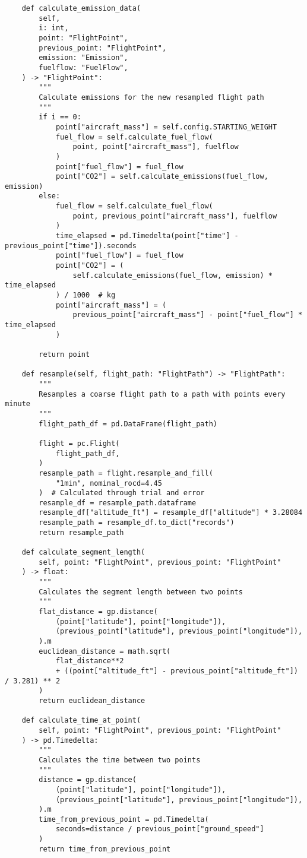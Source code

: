 \begin{verbatim}
    def calculate_emission_data(
        self,
        i: int,
        point: "FlightPoint",
        previous_point: "FlightPoint",
        emission: "Emission",
        fuelflow: "FuelFlow",
    ) -> "FlightPoint":
        """
        Calculate emissions for the new resampled flight path
        """
        if i == 0:
            point["aircraft_mass"] = self.config.STARTING_WEIGHT
            fuel_flow = self.calculate_fuel_flow(
                point, point["aircraft_mass"], fuelflow
            )
            point["fuel_flow"] = fuel_flow
            point["CO2"] = self.calculate_emissions(fuel_flow, emission)
        else:
            fuel_flow = self.calculate_fuel_flow(
                point, previous_point["aircraft_mass"], fuelflow
            )
            time_elapsed = pd.Timedelta(point["time"] - previous_point["time"]).seconds
            point["fuel_flow"] = fuel_flow
            point["CO2"] = (
                self.calculate_emissions(fuel_flow, emission) * time_elapsed
            ) / 1000  # kg
            point["aircraft_mass"] = (
                previous_point["aircraft_mass"] - point["fuel_flow"] * time_elapsed
            )

        return point

    def resample(self, flight_path: "FlightPath") -> "FlightPath":
        """
        Resamples a coarse flight path to a path with points every minute
        """
        flight_path_df = pd.DataFrame(flight_path)

        flight = pc.Flight(
            flight_path_df,
        )
        resample_path = flight.resample_and_fill(
            "1min", nominal_rocd=4.45
        )  # Calculated through trial and error
        resample_df = resample_path.dataframe
        resample_df["altitude_ft"] = resample_df["altitude"] * 3.28084
        resample_path = resample_df.to_dict("records")
        return resample_path

    def calculate_segment_length(
        self, point: "FlightPoint", previous_point: "FlightPoint"
    ) -> float:
        """
        Calculates the segment length between two points
        """
        flat_distance = gp.distance(
            (point["latitude"], point["longitude"]),
            (previous_point["latitude"], previous_point["longitude"]),
        ).m
        euclidean_distance = math.sqrt(
            flat_distance**2
            + ((point["altitude_ft"] - previous_point["altitude_ft"]) / 3.281) ** 2
        )
        return euclidean_distance

    def calculate_time_at_point(
        self, point: "FlightPoint", previous_point: "FlightPoint"
    ) -> pd.Timedelta:
        """
        Calculates the time between two points
        """
        distance = gp.distance(
            (point["latitude"], point["longitude"]),
            (previous_point["latitude"], previous_point["longitude"]),
        ).m
        time_from_previous_point = pd.Timedelta(
            seconds=distance / previous_point["ground_speed"]
        )
        return time_from_previous_point


\end{verbatim}
